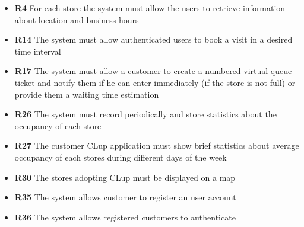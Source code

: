 \begin{itemize}
\begin{itemize}
        \item \textbf{R4} For each store the system must allow the users to retrieve information about location and business hours
        \item \textbf{R14} The system must allow authenticated users to book a visit in a desired time interval
        \item \textbf{R17} The system must allow a customer to create a numbered virtual queue ticket and notify them if he can enter immediately (if the store is not full) or provide them a waiting time estimation
        \item \textbf{R26} The system must record periodically and store statistics about the occupancy of each store
        \item \textbf{R27} The customer CLup application must show brief statistics about average occupancy of each stores during different days of the week
        \item \textbf{R30} The stores adopting CLup must be displayed on a map        
        \item \textbf{R35} The system allows customer to register an user account
        \item \textbf{R36} The system allows registered customers to authenticate
    \end{itemize}
\end{itemize}

\clearpage
